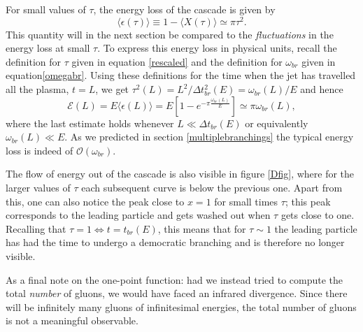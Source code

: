 \documentclass[a4paper,12pt]{article}
\numberwithin{equation}{section}
\begin{document}
For small values of $\tau$, the energy loss of the cascade is given by
\begin{equation}\label{epsilon}
 \langle \epsilon(\tau) \rangle \equiv 1- \langle X(\tau)\rangle \simeq \pi \tau^2.
\end{equation}
This quantity will in the next section be compared to the \emph{fluctuations} in the energy loss at small $\tau$. To express this energy loss in physical units, recall the definition for $\tau$ given in equation \eqref{rescaled} and the definition for $\omega_{br}$ given in equation\eqref{omegabr}. Using these definitions for the time when the jet has travelled all the plasma, $t=L$, we get $\tau^2(L)=L^2/\Delta t^2_{br}(E)=\omega_{br}(L)/E$ and hence 
\begin{equation}
\mathcal{E}(L)=E\langle \epsilon(L) \rangle = E \left[ 1-e^{-\pi \frac{\omega_{br}(L)}{E}} \right] \simeq \pi \omega_{br}(L),
\end{equation}
where the last estimate holds whenever $L\ll \Delta t_{br}(E)$ or equivalently $\omega_{br}(L) \ll E$. As we predicted in section \ref{multiplebranchings} the typical energy loss is indeed of $\mathcal{O}(\omega_{br})$.


The flow of energy out of the cascade is also visible in figure \ref{Dfig}, where for the larger values of $\tau$ each subsequent curve is below the previous one. Apart from this, one can also notice the peak close to $x=1$ for small times $\tau$; this peak corresponds to the leading particle and gets washed out when $\tau$ gets close to one. Recalling that $\tau=1 \Leftrightarrow t=t_{br}(E)$, this means that for $\tau \sim 1$ the leading particle has had the time to undergo a democratic branching and is therefore no longer visible.



As a final note on the one-point function: had we instead tried to compute the total \emph{number} of gluons, we would have faced an infrared divergence. Since there will be infinitely many gluons of infinitesimal energies, the total number of gluons is not a meaningful observable.
\end{document}
